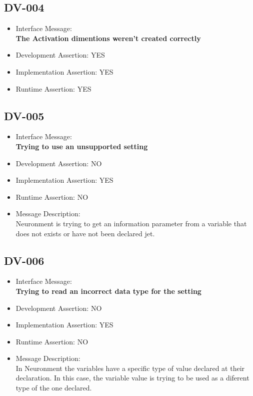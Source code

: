\subsection{DV-004}
\begin{itemize}
  \item Interface Message:\\[1em]
    \textbf{The Activation dimentions weren't created correctly}
  \item Development Assertion: YES
  \item Implementation Assertion: YES
  \item Runtime Assertion: YES
\end{itemize}

\subsection{DV-005}
\begin{itemize}
  \item Interface Message:\\[1em]
    \textbf{Trying to use an unsupported setting}
  \item Development Assertion: NO
  \item Implementation Assertion: YES
  \item Runtime Assertion: NO
  \item Message Description:\\[1em]
    Neuronment is trying to get an information parameter from a variable that does not exists or have not been declared jet.
\end{itemize}

\subsection{DV-006}
\begin{itemize}
  \item Interface Message:\\[1em]
    \textbf{Trying to read an incorrect data type for the setting}
  \item Development Assertion: NO
  \item Implementation Assertion: YES
  \item Runtime Assertion: NO
  \item Message Description:\\[1em]
    In Neuronment the variables have a specific type of value declared at their declaration. In this case, the variable value is trying to be used as a diferent type of the one declared.
\end{itemize}

